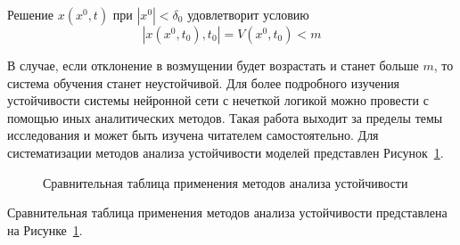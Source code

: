 Решение $x(x^0, t)$ при $|x^0|<\delta_0$ удовлетворит условию
\begin{equation}
    \label{eq:equation56}
    |x(x^0,t_0), t_0|  = V(x^0, t_0) < m
\end{equation}

В случае, если отклонение в возмущении будет возрастать и станет больше $m$, то система обучения станет неустойчивой. Для более подробного изучения устойчивости системы нейронной сети с нечеткой логикой можно провести с помощью иных аналитических методов. Такая работа выходит за пределы темы исследования и может быть изучена читателем самостоятельно. Для систематизации методов анализа устойчивости моделей представлен Рисунок~\cref{fig:Trel}.

\begin{figure}[ht]
    \caption{Сравнительная таблица применения методов анализа устойчивости}\label{fig:Trel}
\end{figure}

Сравнительная таблица применения методов анализа устойчивости представлена на Рисунке~\cref{fig:Trel}.
